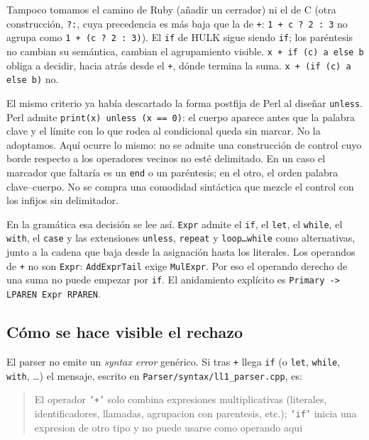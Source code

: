\documentclass[11pt,a4paper]{article}
\begin{document}
Tampoco tomamos el camino de Ruby (añadir un cerrador) ni el de C (otra construcción, \texttt{?:}, cuya precedencia es más baja que la de \texttt{+}: \texttt{1 + c ? 2 : 3} no agrupa como \texttt{1 + (c ? 2 : 3)}). El \texttt{if} de HULK sigue siendo \texttt{if}; los paréntesis no cambian su semántica, cambian el agrupamiento visible. \texttt{x + if (c) a else b} obliga a decidir, hacia atrás desde el \texttt{+}, dónde termina la suma. \texttt{x + (if (c) a else b)} no.

El mismo criterio ya había descartado la forma postfija de Perl al diseñar \texttt{unless}. Perl admite \texttt{print(x) unless (x == 0)}: el cuerpo aparece antes que la palabra clave y el límite con lo que rodea al condicional queda sin marcar. No la adoptamos. Aquí ocurre lo mismo: no se admite una construcción de control cuyo borde respecto a los operadores vecinos no esté delimitado. En un caso el marcador que faltaría es un \texttt{end} o un paréntesis; en el otro, el orden palabra clave--cuerpo. No se compra una comodidad sintáctica que mezcle el control con los infijos sin delimitador.

En la gramática esa decisión se lee así. \texttt{Expr} admite el \texttt{if}, el \texttt{let}, el \texttt{while}, el \texttt{with}, el \texttt{case} y las extensiones \texttt{unless}, \texttt{repeat} y \texttt{loop\ldots while} como alternativas, junto a la cadena que baja desde la asignación hasta los literales. Los operandos de \texttt{+} no son \texttt{Expr}: \texttt{AddExprTail} exige \texttt{MulExpr}. Por eso el operando derecho de una suma no puede empezar por \texttt{if}. El anidamiento explícito es \texttt{Primary -> LPAREN Expr RPAREN}.

\subsection{Cómo se hace visible el rechazo}

El parser no emite un \textit{syntax error} genérico. Si tras \texttt{+} llega \texttt{if} (o \texttt{let}, \texttt{while}, \texttt{with}, \ldots) el mensaje, escrito en \texttt{Parser/syntax/ll1\_parser.cpp}, es:

\begin{quote}
\small
El operador \texttt{'+'} solo combina expresiones multiplicativas (literales, identificadores, llamadas, agrupacion con parentesis, etc.); \texttt{'if'} inicia una expresion de otro tipo y no puede usarse como operando aqui
\end{quote}
\end{document}
